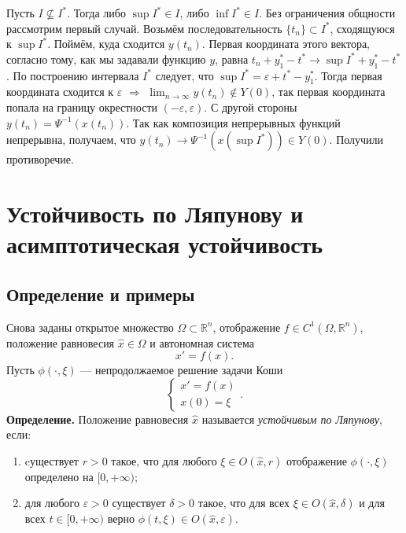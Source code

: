 \begin{enumerate}
    Пусть $I \nsubseteq I^*$. Тогда либо $\sup I^* \in I$, либо $\inf I^* \in I$. Без ограничения общности рассмотрим первый случай. Возьмём последовательность $\{t_n\} \subset I^*$, сходящуюся к $\sup I^*$. Поймём, куда сходится $y(t_n)$. Первая координата этого вектора, согласно тому, как мы задавали функцию $y$, равна $t_n + y_1^* - t^* \to \sup I^* + y_1^* - t^*$. По построению интервала $I^*$ следует, что $\sup I^* = \varepsilon + t^* - y_1^*$. Тогда первая координата сходится к $\varepsilon$ $\Rightarrow$ $\lim_{n\to\infty}y(t_n) \notin Y(0)$, так первая координата попала на границу окрестности $(-\varepsilon, \varepsilon)$.
    С другой стороны $y(t_n) = \Psi^{-1}(x(t_n))$. Так как композиция непрерывных функций непрерывна, получаем, что $y(t_n) \to \Psi^{-1}(x(\sup I^*)) \in Y(0)$. Получили противоречие.
\end{enumerate}

\QED


\setcounter{equation}{0}
\section{Устойчивость по Ляпунову и асимптотическая устойчивость}
\subsection{Определение и примеры}
Снова заданы открытое множество $\Omega \subset \mathbb R^n$, отображение $f \in C^1(\Omega, \mathbb R^n)$, положение равновесия $\widehat{x} \in \Omega$ и автономная система
\begin{equation}
    x' = f(x).
\end{equation}
Пусть $\phi(\cdot, \xi)$ --- непродолжаемое решение задачи Коши 
\[
\begin{cases}
    x' = f(x)\\
    x(0) = \xi
\end{cases}.
\]
\textbf{Определение.} Положение равновесия $\widehat{x}$ называется \textit{устойчивым по Ляпунову}, если:
\begin{enumerate}
    \item cуществует $r > 0$ такое, что для любого $\xi \in O(\widehat{x}, r)$ отображение $\phi(\cdot, \xi)$ определено на $[0, +\infty)$;
    \item для любого $\varepsilon > 0$ существует $\delta > 0$ такое, что для всех $\xi \in O(\widehat{x}, \delta)$ и для всех $t \in [0, +\infty)$ верно $\phi(t, \xi) \in O(\widehat{x}, \varepsilon)$.
\end{enumerate}

